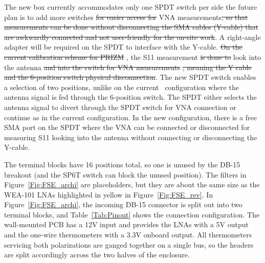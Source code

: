 The new box currently accommodates only one SPDT switch per side the future plan is to add more switches \st{for easier access for}  VNA measurements\st{, so that measurements can be done without disconnecting the SMA cables (Y-cable) that are awkwardly connected and not user-friendly for the on-site work}.  A right-angle adapter will be required on the SPDT to interface with the Y-cable.  \st{On the current calibration scheme for PRIZM} , the S11 measurement \st{is done to} look into the antenna \st{and into the switch for VNA measurements} \st{, meaning the Y cable and the 6-position switch physical disconnection}. The new SPDT switch enables a selection of two positions, unlike on the current \prizm\ configuration where the antenna signal is fed through the 6-position switch. The SPDT either selects the antenna signal to divert through the SPDT switch for VNA connection or continue as in the current configuration. In the new configuration, there is a free SMA port on the SPDT where the VNA can be connected or disconnected for measuring S11 looking into the antenna without connecting or disconnecting the Y-cable. 

The terminal blocks  have 16 positions total, so one is unused by the DB-15 breakout (and the SP6T switch can block the unused position). The filters in Figure~\ref{Fig:FSE_archi} are placeholders, but they are about the same size as the WEA-101 LNAs highlighted in yellow in Figure~\ref{Fig:FSE_rev}. In Figure~\ref{Fig:FSE_archi}, the incoming DB-15 connector is split out into two terminal blocks, and Table~\ref{Tab:Pinout} shows the connection configuration. The wall-mounted PCB has a 12V input and provides the LNAs with a 5V output and the one-wire thermometers with a 3.3V onboard output. All thermometers servicing both polarizations are ganged together on a single bus, so the headers are split accordingly across the two halves of the enclosure.

